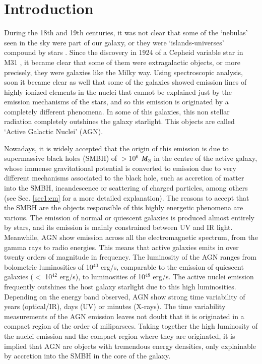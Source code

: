 
\chapter{Introduction}
\label{chap:intro}

During the 18th and 19th centuries, it was not clear that some of the ‘nebulas’ seen in the sky were part of our galaxy, or they were ‘islands-universes’ compound by stars \citep{kant1755}. Since the discovery in 1924 of a Cepheid variable star in M31 \citep{hubble29}, it became clear that some of them were extragalactic objects, or more precisely, they were galaxies like the Milky way. Using spectroscopic analysis, soon it became clear as well that some of the galaxies showed emission lines of highly ionized elements in the nuclei \citep{seyfert43} that cannot be explained just by the emission mechanisms of the stars, and so this emission is originated by a completely different phenomena. In some of this galaxies, this non stellar radiation completely outshines the galaxy starlight. This objects are called ‘Active Galactic Nuclei’ (AGN). 


Nowadays, it is widely accepted that the origin of this emission is due to supermassive black holes (SMBH) of $>$10$^{6}$  $M_\odot$ in the centre of the active galaxy, whose immense gravitational potential is converted to emission due to very different mechanisms associated to the black hole, such as accretion of matter into the SMBH, incandescence or scattering of charged particles, among others (see Sec. \ref{sec1:em} for a more detailed explanation). The reasons to accept that the SMBH are the objects responsible of this highly energetic phenomena are various. The emission of normal or quiescent galaxies is produced almost entirely by stars, and its emission is mainly constrained between UV and IR light. Meanwhile, AGN show emission across all the electromagnetic spectrum, from the gamma rays to radio energies. This means that active galaxies emits in over twenty orders of magnitude in frequency. The luminosity of the AGN ranges from bolometric luminosities of 10$^{40}$ erg/s, comparable to the emission of quiescent galaxies (\Lbol $<$ 10$^{42}$ erg/s), to luminosities of 10$^{48}$ erg/s. The active nuclei emission frequently outshines the host galaxy starlight due to this high luminosities. Depending on the energy band observed, AGN show strong time variability of years (optical/IR), days (UV) or minutes (X-rays). The time variability measurements of the AGN emission leaves not doubt that it is originated in a compact region of the order of miliparsecs. Taking together the high luminosity of the nuclei emission and the compact region where they are originated, it is implied that AGN are objects with tremendous energy densities, only explainable by accretion into the SMBH in the core of the galaxy. 


